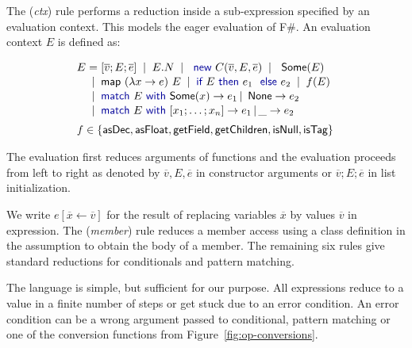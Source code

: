 \documentclass[10pt,preprint,clearpagebib]{sigplanconf}
\newcommand{\kvd}[1]{\textnormal{\textcolor{kvdclr}{\sffamily #1}}}
\newcommand{\ident}[1]{\textnormal{\sffamily #1}}
\newcommand{\lsep}[0]{\;\; | \;\;}
\newcommand{\narrow}[1]{\hspace{-0.7em} #1 \hspace{-0.7em}}
\begin{document}
The (\emph{ctx}) rule performs a reduction inside a sub-expression specified by an evaluation context.
This models the eager evaluation of F\#. An evaluation context $E$ is defined as:

\vspace{0.5em}
\noindent
\begin{equation*}
\begin{array}{l}
\hspace{-0.5em}
\begin{array}{rcl}
 E &\narrow{=}& [\overline{v};E;\overline{e}] \lsep E.N \lsep \kvd{new}~C(\overline{v}, E, \overline{e}) \lsep \ident{Some}(E) \\[0.1em]
   &\narrow{|}& \ident{map}~(\lambda x\rightarrow e)~E \lsep \kvd{if}~E~\kvd{then}~e_1~\kvd{else}~e_2 \lsep f(E)\\[0.1em]
   &\narrow{|}& \kvd{match}~E~\kvd{with}~\ident{Some}(x) \rightarrow e_1 \,|\, \ident{None} \rightarrow e_2 \\[0.1em]
   &\narrow{|}& \kvd{match}~E~\kvd{with}~[x_1; \ldots; x_n] \rightarrow e_1 \,|\, \_ \rightarrow e_2
\end{array} \\[2.5em]
f \in \{ \ident{asDec}, \ident{asFloat}, \ident{getField}, \ident{getChildren}, \ident{isNull}, \ident{isTag} \}
\end{array}
\end{equation*}

\noindent
The evaluation first reduces arguments of functions and the evaluation proceeds from left to right 
as denoted by $\overline{v}, E, \overline{e}$ in constructor arguments or $\overline{v};E;\overline{e}$
in list initialization.

We write $e[\overline{x} \leftarrow \overline{v}]$ for the result of replacing variables $\overline{x}$ by
values $\overline{v}$ in expression. The (\emph{member}) rule reduces a member access using a class 
definition in the assumption to obtain the body of a member. The remaining six rules
give standard reductions for conditionals and pattern matching.

The language is simple, but sufficient for our purpose. All expressions reduce to a value in a 
finite number of steps or get stuck due to an error condition. An error condition can be a wrong 
argument passed to conditional, pattern matching or one of the conversion functions from 
Figure~\ref{fig:op-conversions}.

\end{document}
